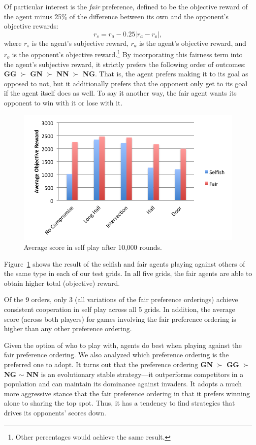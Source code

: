 \documentclass[letterpaper]{article}
\begin{document}
Of particular interest is the \emph{fair} preference, defined to be
the objective reward of the agent minus 25\% of the difference between
its own and the opponent's objective rewards:
$$r_{s} = r_{a} - 0.25 \left| r_{a} - r_{o} \right|,$$ where $r_{s}$
is the agent's subjective reward, $r_{a}$ is the agent's objective
reward, and $r_{o}$ is the opponent's objective reward.\footnote{Other
percentages would achieve the same result.}  By incorporating this
fairness term into the agent's subjective reward, it strictly prefers 
the following order of outcomes: {\bf GG} $\succ$ {\bf GN} $\succ$
{\bf NN} $\succ$ {\bf NG}.  That is, the agent prefers making it to
its goal as opposed to not, but it additionally prefers that the
opponent only get to its goal if the agent itself does as well. To say
it another way, the fair agent wants its opponent to win with it or
lose with it.
\begin{figure}
\centering
\includegraphics[width=0.8\columnwidth]{figures/SelfPlay.png}
\caption{Average score in self play after 10,000 rounds.}
\label{f:selfplay}
\end{figure}

Figure~\ref{f:selfplay} shows the result of the selfish and fair
agents playing against others of the same type in each of our test
grids. In all five grids, the fair agents are able to obtain higher
total (objective) reward. 

Of the 9 orders, only 3 (all variations of the fair preference
orderings) achieve consistent cooperation in self play across all 5
grids. In addition, the average score (across both players) for games
involving the fair preference ordering is higher than any other
preference ordering. %

Given the option of who to play with, agents do best when playing
against the fair preference ordering. We also analyzed which
preference ordering is the preferred one to adopt. It turns out that
the preference ordering {\bf GN} $\succ$ {\bf GG} $\succ$ {\bf NG}
$\sim$ {\bf NN} is an evolutionary stable strategy---it outperforms
competitors in a population and can maintain its dominance against
invaders. It adopts a much more aggressive stance that the fair
preference ordering in that it prefers winning alone to sharing the
top spot. Thus, it has a tendency to find strategies that drives its
opponents' scores down.
\end{document}
